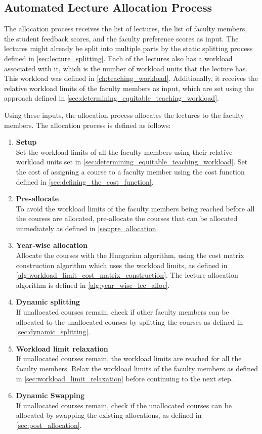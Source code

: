 \subsection{Automated Lecture Allocation Process}
\label{sec:allocation_process}

The allocation process receives the list of lectures, the list of faculty members, the student feedback scores, and the faculty preference scores as input. The lectures might already be split into multiple parts by the static splitting process defined in \autoref{sec:lecture_splitting}. Each of the lectures also has a workload associated with it, which is the number of workload units that the lecture has. This workload was defined in \autoref{ch:teaching_workload}. Additionally, it receives the relative workload limits of the faculty members as input, which are set using the approach defined in \autoref{sec:determining_equitable_teaching_workload}.

Using these inputs, the allocation process allocates the lectures to the faculty members. The allocation process is defined as follows:

\begin{enumerate}
  \item \textbf{Setup}\\
        Set the workload limits of all the faculty members using their relative workload units set in \autoref{sec:determining_equitable_teaching_workload}. Set the cost of assigning a course to a faculty member using the cost function defined in \autoref{sec:defining_the_cost_function}.
  \item \textbf{Pre-allocate}\\
        To avoid the workload limits of the faculty members being reached before all the courses are allocated, pre-allocate the courses that can be allocated immediately as defined in \autoref{sec:pre_allocation}.
  \item \textbf{Year-wise allocation}\\
        Allocate the courses with the Hungarian algorithm, using the cost matrix construction algorithm which uses the workload limits, as defined in \autoref{alg:workload_limit_cost_matrix_construction}. The lecture allocation algorithm is defined in \autoref{alg:year_wise_lec_alloc}.
  \item \textbf{Dynamic splitting}\\
        If unallocated courses remain, check if other faculty members can be allocated to the unallocated courses by splitting the courses as defined in \autoref{sec:dynamic_splitting}.
  \item \textbf{Workload limit relaxation}\\
        If unallocated courses remain, the workload limits are reached for all the faculty members. Relax the workload limits of the faculty members as defined in \autoref{sec:workload_limit_relaxation} before continuing to the next step.
  \item \textbf{Dynamic Swapping}\\
        If unallocated courses remain, check if the unallocated courses can be allocated by swapping the existing allocations, as defined in \autoref{sec:post_allocation}.
\end{enumerate}

